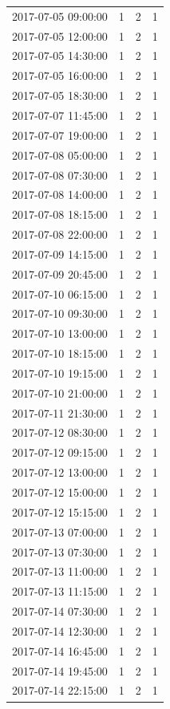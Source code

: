 \begin{tabular}{lrrr}
2017-07-05 09:00:00 & 1 & 2 & 1 \\
2017-07-05 12:00:00 & 1 & 2 & 1 \\
2017-07-05 14:30:00 & 1 & 2 & 1 \\
2017-07-05 16:00:00 & 1 & 2 & 1 \\
2017-07-05 18:30:00 & 1 & 2 & 1 \\
2017-07-07 11:45:00 & 1 & 2 & 1 \\
2017-07-07 19:00:00 & 1 & 2 & 1 \\
2017-07-08 05:00:00 & 1 & 2 & 1 \\
2017-07-08 07:30:00 & 1 & 2 & 1 \\
2017-07-08 14:00:00 & 1 & 2 & 1 \\
2017-07-08 18:15:00 & 1 & 2 & 1 \\
2017-07-08 22:00:00 & 1 & 2 & 1 \\
2017-07-09 14:15:00 & 1 & 2 & 1 \\
2017-07-09 20:45:00 & 1 & 2 & 1 \\
2017-07-10 06:15:00 & 1 & 2 & 1 \\
2017-07-10 09:30:00 & 1 & 2 & 1 \\
2017-07-10 13:00:00 & 1 & 2 & 1 \\
2017-07-10 18:15:00 & 1 & 2 & 1 \\
2017-07-10 19:15:00 & 1 & 2 & 1 \\
2017-07-10 21:00:00 & 1 & 2 & 1 \\
2017-07-11 21:30:00 & 1 & 2 & 1 \\
2017-07-12 08:30:00 & 1 & 2 & 1 \\
2017-07-12 09:15:00 & 1 & 2 & 1 \\
2017-07-12 13:00:00 & 1 & 2 & 1 \\
2017-07-12 15:00:00 & 1 & 2 & 1 \\
2017-07-12 15:15:00 & 1 & 2 & 1 \\
2017-07-13 07:00:00 & 1 & 2 & 1 \\
2017-07-13 07:30:00 & 1 & 2 & 1 \\
2017-07-13 11:00:00 & 1 & 2 & 1 \\
2017-07-13 11:15:00 & 1 & 2 & 1 \\
2017-07-14 07:30:00 & 1 & 2 & 1 \\
2017-07-14 12:30:00 & 1 & 2 & 1 \\
2017-07-14 16:45:00 & 1 & 2 & 1 \\
2017-07-14 19:45:00 & 1 & 2 & 1 \\
2017-07-14 22:15:00 & 1 & 2 & 1 \\

\end{tabular}
